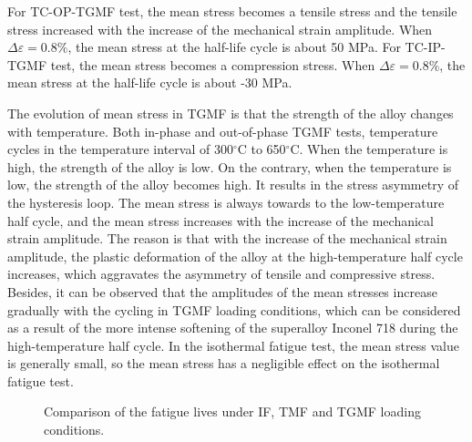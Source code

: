 For TC-OP-TGMF test, the mean stress becomes a tensile stress and the tensile stress increased with the increase of the mechanical strain amplitude.
When $\Delta \varepsilon=0.8\%$, the mean stress at the half-life cycle is about 50 MPa. For TC-IP-TGMF test, the mean stress becomes a compression stress. When $\Delta \varepsilon=0.8\%$, the mean stress at the half-life cycle is about -30 MPa.

The evolution of mean stress in TGMF is that the strength of the alloy changes with temperature. Both in-phase and out-of-phase TGMF tests, temperature cycles in the temperature interval of 300$^\circ$C to 650$^\circ$C. When the temperature is high, the strength of the alloy is low. On the contrary, when the temperature is low, the strength of the alloy becomes high. It results in the stress asymmetry of the hysteresis loop. The mean stress is always towards to the low-temperature half cycle, and the mean stress increases with the increase of the mechanical strain amplitude.
The reason is that with the increase of the mechanical strain amplitude, the plastic deformation of the alloy at the high-temperature half cycle increases, which aggravates the asymmetry of tensile and compressive stress.
Besides, it can be observed that the amplitudes of the mean stresses increase gradually with the cycling in TGMF loading conditions, which can be considered as a result of the more intense softening of the superalloy Inconel 718 during the high-temperature half cycle. In the isothermal fatigue test, the mean stress value is generally small, so the mean stress has a negligible effect on the isothermal fatigue test.

\begin{figure}[!htp]
\caption{Comparison of the fatigue lives under IF, TMF and TGMF loading conditions.}
\label{Fig:plot_exp_fatigue_life_TGMF}
\end{figure}


